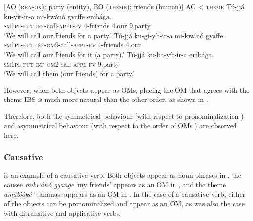 \documentclass[output=paper,
            colorlinks, citecolor=brown
            ,draftmode
		  ]{langscibook}
\begin{document}
\newpage
\ea%
    \label{ex:yoneda:34}
    [AO (\textsc{reason}): party (entity), BO (\textsc{theme}): friends (human)]  AO < \textsc{theme}
    \ea\label{ex:yoneda:34a}\gll Tú-jjá         ku-yít-ir-a           mi-kwánó   gyaffe   embága.\\
         \textsc{sm1pl-fut}    \textsc{inf}-call-\textsc{appl-fv} 4-friends    4.our    9.party\\
    \glt ‘We will call our friends for a party.’
    \ex\label{ex:yoneda:34b}\gll Tú-jjá         ku-gi-yít-ir-a             mi-kwánó   gyaffe.\\
    \textsc{sm1pl-fut}    \textsc{inf-om9}-call-\textsc{appl-fv}    4-friends    4.our\\
    \glt ‘We will call our friends for it (a party).’
    \ex\label{ex:yoneda:34c}\gll Tú-jjá         ku-ba-yít-ir-a             embága.\\
    \textsc{sm1pl-fut}    \textsc{inf-om2}-call-\textsc{appl-fv}    9.party\\
    \glt ‘We will call them (our friends) for a party.’ 
    \z
\z
        

    However, when both objects appear as OMs, placing the OM that agrees with the theme IBS is much more natural than the other order, as shown in .  

\ea%
    \label{ex:yoneda:35}
    \z
\z


    Therefore, both the symmetrical behaviour (with respect to pronominalization ) and asymmetrical behaviour (with respect to the order of OMs ) are observed here.   


\subsubsection{Causative}
\label{sec:yoneda:3.3.3}

 is an example of a causative verb. Both objects appear as noun phrases in , the causee \textit{mikwánó gyange} ‘my friends’ appears as an OM in , and the theme \textit{amátóóké} ‘bananas’ appears as an OM in . In the case of a causative verb, either of the objects can be pronominalized and appear as an OM, as was also the case with ditransitive and applicative verbs. 
\end{document}
